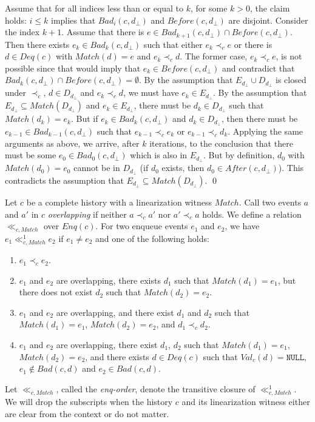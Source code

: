 \documentclass{LMCS}
\newcommand{\NULL}{\ensuremath{\mathtt{NULL}}}
\newcommand{\Match}{\ensuremath{\mathit{Match}}}
\newcommand{\Deq}[1]{\ensuremath{\mathit{Deq}({#1})}}
\newcommand{\Enq}[1]{\ensuremath{\mathit{Enq}({#1})}}
\newcommand{\Before}[2]{\ensuremath{\mathit{Before}({#1},{#2})}}
\newcommand{\After}[2]{\ensuremath{\mathit{After}({#1},{#2})}}
\newcommand{\Val}[2]{\ensuremath{\mathit{Val}_{#1}({#2})}}
\newcommand{\Bad}[2]{\ensuremath{\mathit{Bad}(#1,#2)}}
\newcommand{\Badx}[3]{\ensuremath{\mathit{Bad}_{#3}(#1,#2)}}
\newcommand{\dhat}{\ensuremath{d_{\bot}}}
\newcommand{\Dhat}{\ensuremath{D_{\dhat}}}
\newcommand{\Ehat}{\ensuremath{E_{\dhat}}}
\begin{document}
Assume that for all indices less than or equal to $k$, for some $k>0$, the claim holds: $i\leq k$ implies that $\Badx c {\dhat} i$ and $\Before c \dhat$ are disjoint.
Consider the index $k+1$.
Assume that there is $e\in \Badx c {\dhat} {k+1} \cap \Before c \dhat$. 
Then there exists $e_k\in \Badx c {\dhat} k$ such that either $e_k\prec_c e$ or there is $d\in \Deq c$ with $\Match(d)=e$ and $e_k\prec_c d$.
The former case, $e_k\prec_c e$, is not possible since that would imply that $e_k\in \Before c {\dhat}$ and contradict that $\Badx c {\dhat} k \cap \Before c \dhat = \emptyset$.
By the assumption that $\Ehat \cup \Dhat$ is closed under $\prec_c$, $d\in \Dhat$ and $e_k\prec_c d$, we must have $e_k\in \Ehat$.
By the assumption that $\Ehat \subseteq \Match(\Dhat)$ and $e_k\in \Ehat$, there must be $d_k\in \Dhat$ such that $\Match(d_k)=e_k$.
But if $e_k\in \Badx c {\dhat} k$ and $d_k\in \Dhat$, then there must be $e_{k-1}\in \Badx c {\dhat} {k-1}$ such that $e_{k-1}\prec_c e_k$ or $e_{k-1}\prec_c d_k$.
Applying the same arguments as above, we arrive, after $k$ iterations, to the conclusion that there must be some $e_0\in \Badx c {\dhat} 0$ which is also in $\Ehat$.
But by definition, $d_0$ with $\Match(d_0)=e_0$ cannot be in $\Dhat$ (if $d_0$ exists, then $d_0\in \After c {\dhat}$).
This contradicts the assumption that $\Ehat \subseteq \Match(\Dhat)$.
\qed


\begin{defi}
Let $c$ be a complete history with a linearization witness $\Match$.
Call two events $a$ and $a'$ in $c$ {\em overlapping} if neither $a\prec_c a'$ nor $a'\prec_c a$ holds.
We define a relation $\ll_{c,\Match}$ over $\Enq c$. 
For two enqueue events $e_1$ and $e_2$, we have $e_1\ll^1_{c,\Match}e_2$ if $e_1\neq e_2$ and one of the following holds:
\begin{enumerate}
\item $e_1\prec_c e_2$.
\item $e_1$ and $e_2$ are overlapping, there exists $d_1$ such that $\Match(d_1)=e_1$, but there does not exist $d_2$ such that $\Match(d_2)=e_2$.
\item {\sloppy $e_1$ and $e_2$ are overlapping, and there exist $d_1$ and $d_2$ such that $\Match(d_1)=e_1$, $\Match(d_2)=e_2$, and $d_1\prec_c d_2$.}
\item $e_1$ and $e_2$ are overlapping, there exist $d_1$, $d_2$ such that $\Match(d_1)=e_1$, $\Match(d_2)=e_2$, and there exists $d\in \Deq c$ such that $\Val c d=\NULL$, $e_1\notin \Bad c d$ and $e_2\in \Bad c d$.
\end{enumerate}
Let $\ll_{c,\Match}$, called the {\em enq-order}, denote the transitive closure of $\ll^1_{c,\Match}$.
We will drop the subscripts when the history $c$ and its linearization witness either are clear from the context or do not matter.
\end{defi}
\end{document}
